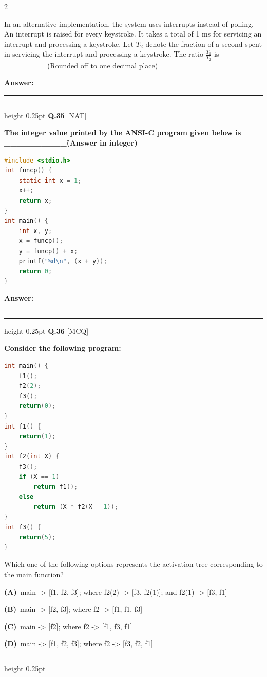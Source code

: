 \documentclass[a4paper,10pt,twoside]{article}
\begin{document}
\begin{multicols}{2}
{In an alternative implementation, the system uses interrupts instead of polling. An interrupt is raised for every keystroke. It takes a total of 1 ms for servicing an interrupt and processing a keystroke. Let $T_2$ denote the fraction of a second spent in servicing the interrupt and processing a keystroke.
The ratio $\frac{T_1}{T_2}$ is \_\_\_\_\_\_\_\_\. (Rounded off to one decimal place) \par}
\par\vspace{3pt}\noindent\textbf{Answer:} \rule{3.2cm}{0.4pt}
\par\vspace{6pt}\hrule height 0.25pt\vspace{6pt}
\noindent\textbf{Q.35} \hfill {\footnotesize\textsf{[NAT]}}
\par\vspace{2pt}
{\bfseries The integer value printed by the ANSI-C program given below is \_\_\_\_\_\_\_\_\_\_\. (Answer in integer)
\begin{lstlisting}[language=C]
#include <stdio.h>
int funcp() {
    static int x = 1;
    x++;
    return x;
}
int main() {
    int x, y;
    x = funcp();
    y = funcp() + x;
    printf("%d\n", (x + y));
    return 0;
}
\end{lstlisting} \par}
\par\vspace{3pt}\noindent\textbf{Answer:} \rule{3.2cm}{0.4pt}
\par\vspace{6pt}\hrule height 0.25pt\vspace{6pt}
\noindent\textbf{Q.36} \hfill {\footnotesize\textsf{[MCQ]}}
\par\vspace{2pt}
{\bfseries Consider the following program:
\begin{lstlisting}[language=C]
int main() {
    f1();
    f2(2);
    f3();
    return(0);
}
int f1() {
    return(1);
}
int f2(int X) {
    f3();
    if (X == 1)
        return f1();
    else
        return (X * f2(X - 1));
}
int f3() {
    return(5);
}
\end{lstlisting}
Which one of the following options represents the activation tree corresponding to the main function? \par}
\par\vspace{2pt}\noindent
\textbf{(A)}~main -> [f1, f2, f3]; where f2(2) -> [f3, f2(1)]; and f2(1) -> [f3, f1]\par\vspace{2pt}\noindent
\textbf{(B)}~main -> [f2, f3]; where f2 -> [f1, f1, f3]\par\vspace{2pt}\noindent
\textbf{(C)}~main -> [f2]; where f2 -> [f1, f3, f1]\par\vspace{2pt}\noindent
\textbf{(D)}~main -> [f1, f2, f3]; where f2 -> [f3, f2, f1]
\par\vspace{6pt}\hrule height 0.25pt\vspace{6pt}


\end{multicols}
\end{document}
